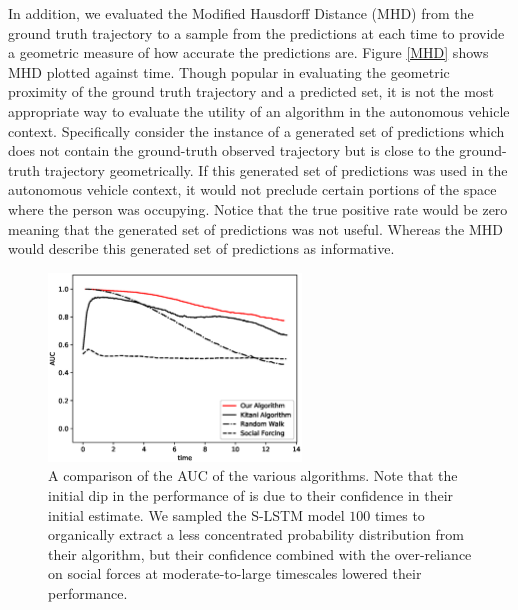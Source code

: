 \documentclass[usenames,dvipsnames]{article}
\begin{document}
\begin{enumerate}
\begin{item}
{	In addition, we evaluated the Modified Hausdorff Distance (MHD) from the ground truth trajectory to a sample from the predictions at each time to provide a geometric measure of how accurate the predictions are. 
	Figure \ref{MHD} shows MHD plotted against time.
	Though popular in evaluating the geometric proximity of the ground truth trajectory and a predicted set, it is not the most appropriate way to evaluate the utility of an algorithm in the autonomous vehicle context. 
	Specifically consider the instance of a generated set of predictions which does not contain the ground-truth observed trajectory but is close to the ground-truth trajectory geometrically. 
	If this generated set of predictions was used in the autonomous vehicle context, it would not preclude certain portions of the space where the person was occupying. 
	Notice that the true positive rate would be zero meaning that the generated set of predictions was not useful.
	Whereas the MHD would describe this generated set of predictions as informative.
}


\begin{figure}
	\centering
	\includegraphics[width=0.6\textwidth]{figures/the_results.eps}
	\caption{A comparison of the AUC of the various algorithms. Note that the initial dip in the performance of \cite{Kitani2012} is due to their confidence in their initial estimate. We sampled the S-LSTM \cite{Alahi2016} model $100$ times to organically extract a less concentrated probability distribution from their algorithm, but their confidence combined with the over-reliance on social forces at moderate-to-large timescales lowered their performance.}
	\reversemarginpar{}
	\label{AUC}
\end{figure}


\end{item}
\end{enumerate}
\end{document}
